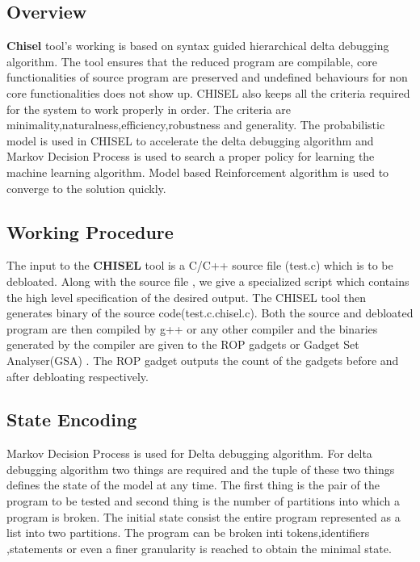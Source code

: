 \documentclass{relatorio}
\begin{document}
\subsection{Overview}%
\label{Tools}

\textbf{Chisel} tool's working is based on syntax guided hierarchical delta debugging algorithm. The tool ensures that the reduced program are compilable, core functionalities of source program are preserved  and undefined behaviours for non core functionalities does not show up. CHISEL also keeps all the criteria required for the system to work properly in order. The criteria are minimality,naturalness,efficiency,robustness and generality. The probabilistic model is used in CHISEL to accelerate the delta debugging algorithm and Markov Decision Process is used to search a proper policy for learning the machine learning algorithm. Model based Reinforcement algorithm is used to converge to the solution quickly.

\subsection{Working Procedure}%
\label{Tools}

The input to the \textbf{CHISEL} tool is a C/C++ source file (test.c) which is to be debloated. Along with the source file , we give a specialized script which contains the high level specification of the desired output. The CHISEL tool then generates binary of the source code(test.c.chisel.c). Both the source and debloated program are then compiled by g++ or any other compiler and the binaries generated by the compiler are given to the ROP gadgets or Gadget Set Analyser(GSA) . The ROP gadget outputs the count of the  gadgets before and after debloating respectively.

\subsection{State Encoding}%
\label{Tools}

Markov Decision Process is used for Delta debugging algorithm. For  delta debugging algorithm two things are required and the tuple of these two things defines the state of the model at any time. The first thing is the pair of the program to be tested and second thing is the number of partitions into which a program is broken. The initial state consist the entire program  represented as a list into two partitions. The program can be broken inti tokens,identifiers ,statements or even a finer granularity is reached to obtain the minimal state.
\end{document}
